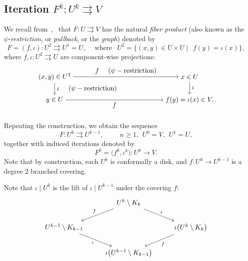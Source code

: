 \documentclass{amsart}
\renewcommand{\sp}{{\ \ }}
\newcommand{\1}{{\mathbb 1 }}
\theoremstyle{remark}
\numberwithin{equation}{section}
\theoremstyle{definition}
\begin{document}
\subsection{Iteration ${F^k\colon U^k\rightrightarrows V}$}\label{subsec:iter}
We recall from~\cite[\S2.2.2]{K},~\cite[\S 3.4.6]{DL:Feigen}  that $F\colon U\rightrightarrows V$ has the natural \emph{fiber product} (also known as the $\psi$-\emph{restriction}, or \emph{pullback}, or the \emph{graph}) 
denoted by 
\[F=(f,\iota)\colon U^2\rightrightarrows  U^1=U,\sp\sp \text{ where }\sp U^2=\{(x,y)\in U\times U\mid\sp f(y)=\iota(x)\},\]
where $f,\iota\colon U^2\rightrightarrows U$ are component-wise projections:
\[\begin{tikzpicture}
\node (A00) at (0,0){$ (x,y)\in U^2 $}; 
\node (A01) at (0,-1.2){$ y\in U $};
\node (A10) at (7,0){$ x\in U $}; 
 \node (A11) at (7,-1.2){$ f(y)=\iota(x)\in V .$}; 
\draw (A00) edge[->] node[right]{$\iota\sp\sp (\psi-\text{restriction})$} (A01);
\draw (A10) edge[->] node[right]{$\iota$} (A11);
\draw (A00) edge[->] node[above]{$f\sp\sp (\psi-\text{restriction}$)} (A10);
\draw (A01) edge[->] node[below]{$f$} (A11);

\end{tikzpicture}
\]


Repeating the construction, we obtain the sequence
\[F\colon U^k\rightrightarrows U^{k-1},\hspace{1cm} n\ge 1, \sp U^0=V ,\sp U^1=U,\]
together with induced iterations denoted by
\begin{equation}
\label{eq:F^k}
 F^k = \big(f^k, \iota^k\big) \colon U^k \to V.
\end{equation}  
Note that by construction, each $U^k$ is conformally a disk, and $f: U^k \longrightarrow U^{k-1}$ is a degree $2$ branched covering.

Note that $\iota\mid U^{k}$ is the lift of $\iota\mid U^{k-1}$ under the covering $f$:
$$
\begin{tikzcd}
& U^k\setminus  K_{k} \arrow[dl, ->, "f"'] \arrow[dr, ->, "\iota"] & \\
U^{k-1}\setminus  K_{k-1} \arrow[dr, ->, "\iota"'] & & \iota\big( U^{k}\setminus  K_{k}\big) \arrow[dl, ->, "f"] \\
& \iota\big( U^{k-1}\setminus  K_{k-1}\big) &
\end{tikzcd}
$$
\end{document}
